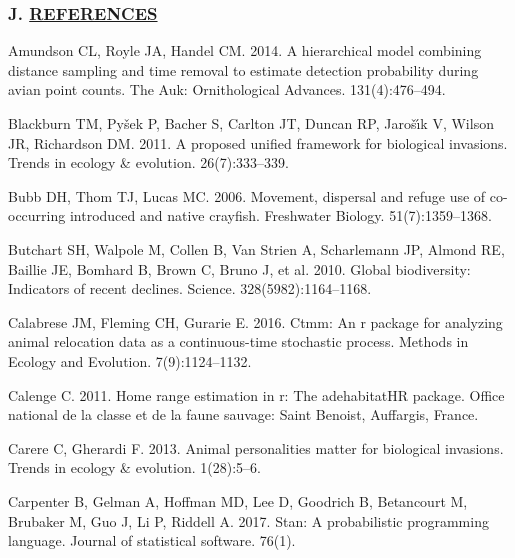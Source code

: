 \documentclass[
]{article}
\begin{document}
\hypertarget{j.-references}{%
\subsubsection*{\texorpdfstring{J.
\href{MyLibrary.bib}{REFERENCES}}{J. REFERENCES}}\label{j.-references}}

\hypertarget{refs}{}
\leavevmode\hypertarget{ref-amundson2014hierarchical}{}%
Amundson CL, Royle JA, Handel CM. 2014. A hierarchical model combining
distance sampling and time removal to estimate detection probability
during avian point counts. The Auk: Ornithological Advances.
131(4):476--494.

\leavevmode\hypertarget{ref-blackburn2011proposed}{}%
Blackburn TM, Pyšek P, Bacher S, Carlton JT, Duncan RP, Jarošı́k V,
Wilson JR, Richardson DM. 2011. A proposed unified framework for
biological invasions. Trends in ecology \& evolution. 26(7):333--339.

\leavevmode\hypertarget{ref-bubb2006movement}{}%
Bubb DH, Thom TJ, Lucas MC. 2006. Movement, dispersal and refuge use of
co-occurring introduced and native crayfish. Freshwater Biology.
51(7):1359--1368.

\leavevmode\hypertarget{ref-butchart2010global}{}%
Butchart SH, Walpole M, Collen B, Van Strien A, Scharlemann JP, Almond
RE, Baillie JE, Bomhard B, Brown C, Bruno J, et al. 2010. Global
biodiversity: Indicators of recent declines. Science.
328(5982):1164--1168.

\leavevmode\hypertarget{ref-calabrese2016ctmm}{}%
Calabrese JM, Fleming CH, Gurarie E. 2016. Ctmm: An r package for
analyzing animal relocation data as a continuous-time stochastic
process. Methods in Ecology and Evolution. 7(9):1124--1132.

\leavevmode\hypertarget{ref-calenge2011home}{}%
Calenge C. 2011. Home range estimation in r: The adehabitatHR package.
Office national de la classe et de la faune sauvage: Saint Benoist,
Auffargis, France.

\leavevmode\hypertarget{ref-carere2013animal}{}%
Carere C, Gherardi F. 2013. Animal personalities matter for biological
invasions. Trends in ecology \& evolution. 1(28):5--6.

\leavevmode\hypertarget{ref-carpenter2017stan}{}%
Carpenter B, Gelman A, Hoffman MD, Lee D, Goodrich B, Betancourt M,
Brubaker M, Guo J, Li P, Riddell A. 2017. Stan: A probabilistic
programming language. Journal of statistical software. 76(1).
\end{document}
